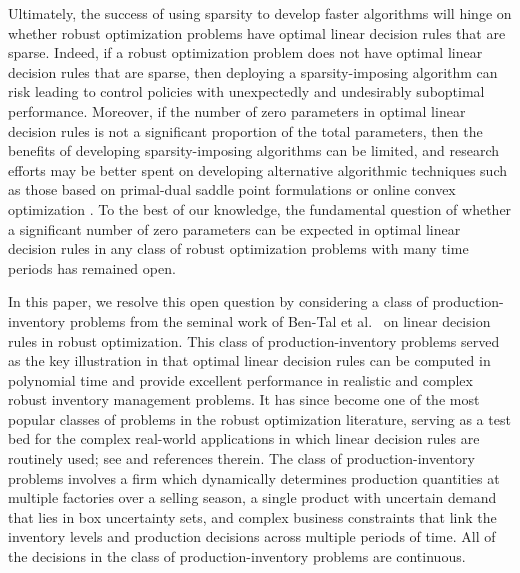 \documentclass[nonblindrev,mnsc]{informs3} %
\begin{document}
Ultimately, the  success of using sparsity to develop faster  algorithms will  hinge on whether robust optimization problems have optimal linear decision rules that are sparse. Indeed, if a robust optimization problem does not have  optimal linear decision rules that are sparse, then deploying a sparsity-imposing algorithm can risk leading to control policies with unexpectedly and undesirably suboptimal performance. Moreover, if the number of zero parameters in optimal linear decision rules is not a significant proportion of the total parameters, then the benefits of developing sparsity-imposing algorithms can be limited, and research efforts may be better spent on developing alternative algorithmic techniques such as those based on primal-dual saddle point  formulations or online convex optimization \cite{postek2021first,ho2018online,ben2015oracle}. To the best of our knowledge, the fundamental question of whether a significant number of zero parameters can be expected in optimal linear decision rules in any class of robust optimization problems with many time periods has remained open.   

In this paper, we resolve this open question 
by considering a class of production-inventory problems from the seminal work of Ben-Tal et al.~\cite{ben2004adjustable} on linear decision rules in robust optimization. This class of production-inventory problems served as the key illustration  in \cite{ben2004adjustable} that optimal linear decision rules can be computed in polynomial time and provide excellent performance in realistic and complex robust inventory management problems. It has since become one of the most popular classes of problems in the robust optimization literature, serving as a test bed for the complex real-world applications in which linear decision rules are routinely used; see \cite{de2016impact} and references therein. The class of production-inventory problems involves a firm which dynamically determines production quantities at multiple factories over a selling season,  a single product with uncertain demand that lies in box uncertainty sets, and complex business constraints that link the inventory levels and production decisions across multiple periods of time. All of the decisions in the class of production-inventory problems are continuous.
\end{document}
